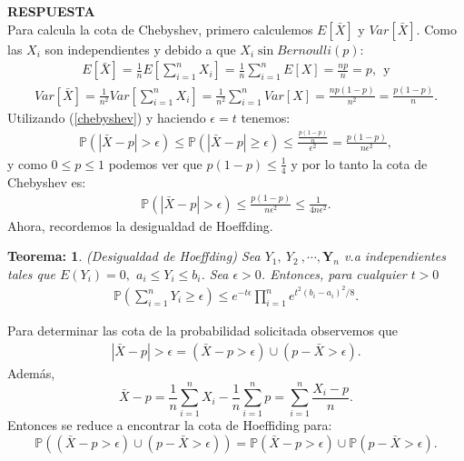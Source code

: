 \documentclass[11pt,letterpaper]{article}
\newcommand{\Y}{\mathbf{Y}}
\newcommand{\mP}{\mathbb{P}}
\newcommand{\res}{\textbf{RESPUESTA}\\}
\newtheorem{thm}{Teorema:}
\begin{document}
\res Para calcula la cota de Chebyshev, primero calculemos $E[\bar{X}]$ y $Var[\bar{X}]$. Como las $X_i$ son independientes y debido a que $X_i\sin Bernoulli(p)$:
\begin{align*}
E[\bar{X}]=\frac{1}{n}E[\sum_{i=1}^nX_i]=\frac{1}{n}\sum_{i=1}^nE[X]=\frac{np}{n}=p, \ \ \text{y}
\end{align*}
\begin{align*}
Var[\bar{X}]=\frac{1}{n^2}Var[\sum_{i=1}^nX_i]=\frac{1}{n^2}\sum_{i=1}^nVar[X]=\frac{np(1-p)}{n^2}=\frac{p(1-p)}{n}.
\end{align*}
Utilizando (\ref{chebyshev}) y haciendo $\epsilon=t$ tenemos:
\begin{align*}
\mP(|\bar{X}-p|>\epsilon) \leq \mP(|\bar{X}-p|\geq \epsilon) \leq \frac{\frac{p(1-p)}{n}}{\epsilon^2}=\frac{p(1-p)}{n\epsilon^2 },
\end{align*}
y como $0\leq p \leq 1$ podemos ver que $p(1-p)\leq \frac{1}{4}$ y por lo tanto la cota de Chebyshev es: 
\begin{align}\label{cota_chebyschev}
\mP(|\bar{X}-p|>\epsilon) \leq \frac{p(1-p)}{n\epsilon^2 } \leq \frac{1}{4n\epsilon^2 }.
\end{align}
Ahora, recordemos la desigualdad de Hoeffding.
\begin{framed}
    \begin{thm} (Desigualdad de Hoeffding) Sea $Y_1, \ Y_2\ ,\cdots,\Y_n$ v.a independientes tales que $E(Y_i)=0,$ $a_i\leq Y_i \leq b_i$. Sea $\epsilon>0$. Entonces, para cualquier $t>0$
        \begin{align}
            \mP\left(\sum_{i=1}^nY_i\geq \epsilon \right) \leq e^{-t\epsilon}\prod_{i=1}^ne^{t^2(b_i-a_i)^2/8}.
        \end{align}
    \end{thm}
\end{framed} 
Para determinar las cota de la probabilidad solicitada observemos que
\begin{align}
\label{valor_absoluto}
|\bar{X}-p|>\epsilon=(\bar{X}-p>\epsilon)\cup(p-\bar{X}>\epsilon).
\end{align}
Además,
\begin{equation}
\label{igualdad}
\bar{X}-p=\frac{1}{n}\sum_{i=1}^n X_i-\frac{1}{n}\sum_{i=1}^n p=\sum_{i=1}^n\frac{X_i-p}{n}.
\end{equation}
Entonces se reduce a encontrar la cota de Hoeffiding para:
$$\mP\left( (\bar{X}-p>\epsilon)\cup(p-\bar{X}>\epsilon)\right)=\mP(\bar{X}-p>\epsilon)\cup\mP(p-\bar{X}>\epsilon).$$
\end{document}
